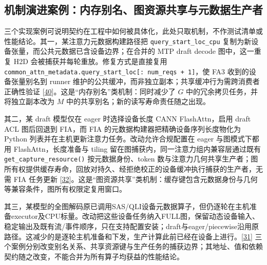 \documentclass[
  UTF8,
  zihao=5]{ctexart}
\begin{document}
\hypertarget{ux673aux5236ux6f14ux8fdbux6848ux4f8bux5185ux5b58ux522bux540dux56feux8d44ux6e90ux5171ux4eabux4e0eux5143ux6570ux636eux751fux4ea7ux8005}{%
\subsection{机制演进案例：内存别名、图资源共享与元数据生产者}\label{ux673aux5236ux6f14ux8fdbux6848ux4f8bux5185ux5b58ux522bux540dux56feux8d44ux6e90ux5171ux4eabux4e0eux5143ux6570ux636eux751fux4ea7ux8005}}

三个实现案例可说明契约在工程中如何被具体化，此处只取机制，不作测试清单或性能结论。其一，某注意力元数据构建路径把
\texttt{query\_start\_loc\_cpu}
复制为新设备张量，而公共元数据已含设备边界；在合并的 MTP draft decode
图中，这一重复 H2D 会被捕获并每轮重放。修复方式是直接复用
\texttt{common\_attn\_metadata.query\_start\_loc{[}:\ num\_reqs\ +\ 1{]}}，使
FA3 收到的设备张量别名到 runner
维护的公共缓冲，而非独立副本；共享缓冲行为需跨消费者正确性验证
{[}\protect\hyperlink{ref-vllmascendpr21191}{40}{]}。这是``内存别名''类机制：同时减少了
\(G\) 中的冗余拷贝任务，并将独立副本改为 \(M\)
中的共享别名；新的读写寿命责任随之出现。

其二，某 draft 模型仅在 eager 时选择设备长度 CANN FlashAttn，启用 draft
ACL 图后回退到 FIA，而 FIA 的元数据构建器把精确设备序列长度物化为 Python
列表并在主机更新注意力任务。改动允许合规配置在 eager 与图模式下都用
FlashAttn，长度准备与 tiling 留在图捕获内，同一注意力组内兼容层通过既有
\texttt{get\_capture\_resource()} 按元数据身份、token
数与注意力几何共享生产者；图所有权提供缓存寿命，回放对持久、经拒绝校正的设备缓冲执行捕获的生产者，无需
FIA 任务更新
{[}\protect\hyperlink{ref-vllmascendpr21281}{32}{]}。这是``图资源共享''类机制：缓存键包含元数据身份与几何等兼容条件，图所有权限定复用窗口。

其三，某模型的全图解码原已调用SAS/QLI设备元数据算子，但仍逐轮在主机准备executor及CPU标量。改动把这些设备任务纳入FULL图，保留动态设备输入、稳定输出及既有流/事件顺序，只在支持配置安装；draft与eager/piecewise沿用原路径。这减少的是逐轮主机准备和下发，生产计算此前已经在设备上进行。{[}\protect\hyperlink{ref-vllmascendpr21259}{31}{]}
三个案例分别改变别名关系、共享资源键与生产任务的捕获边界；其地址、值和依赖契约随之改变，不能合并为所有算子均获益的性能结论。
\end{document}
